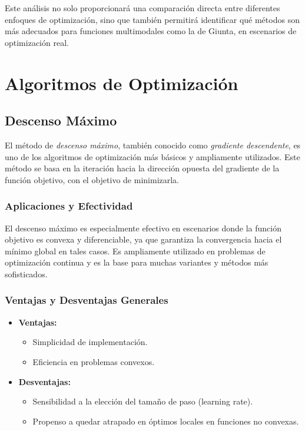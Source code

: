 \documentclass[fontsize=10pt]{article}
\begin{document}
Este análisis no solo proporcionará una comparación 
directa entre diferentes enfoques de optimización, 
sino que también permitirá identificar qué métodos 
son más adecuados para funciones multimodales como 
la de Giunta, en escenarios de optimización real.



\section{Algoritmos de Optimización}


\subsection{Descenso Máximo}

El método de \textit{descenso máximo}, también conocido como \textit{gradiente descendente}, es uno de los algoritmos de optimización más básicos y ampliamente utilizados. Este método se basa en la iteración hacia la dirección opuesta del gradiente de la función objetivo, con el objetivo de minimizarla.

\subsubsection{Aplicaciones y Efectividad}

El descenso máximo es especialmente efectivo en escenarios donde la función objetivo es convexa y diferenciable, ya que garantiza la convergencia hacia el mínimo global en tales casos. Es ampliamente utilizado en problemas de optimización continua y es la base para muchas variantes y métodos más sofisticados.

\subsubsection{Ventajas y Desventajas Generales}

\begin{itemize}
    \item \textbf{Ventajas:} 
    \begin{itemize}
        \item Simplicidad de implementación.
        \item Eficiencia en problemas convexos.
    \end{itemize}
    \item \textbf{Desventajas:} 
    \begin{itemize}
        \item Sensibilidad a la elección del tamaño de paso (learning rate).
        \item Propenso a quedar atrapado en óptimos locales en funciones no convexas.
    \end{itemize}
\end{itemize}
\end{document}
